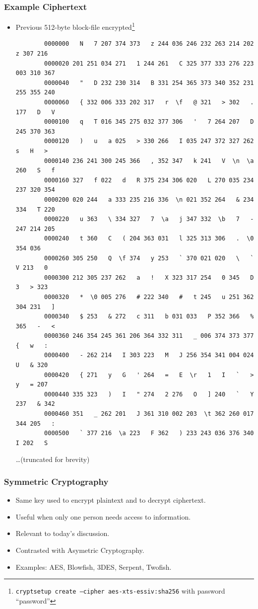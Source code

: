 \documentclass[xcolor={dvipsnames,svgnames},hyperref=dvips]{beamer}
\begin{document}
	\begin{frame}[fragile]
		\frametitle{Example Ciphertext}
		\begin{itemize}
		\item Previous 512-byte block-file encrypted\footnote{\texttt{cryptsetup create --cipher aes-xts-essiv:sha256} with password ``password''} \\
		\begin{lstlisting}
		0000000   N   7 207 374 373   z 244 036 246 232 263 214 202   z 307 216
		0000020 201 251 034 271   1 244 261   C 325 377 333 276 223 003 310 367
		0000040   "   D 232 230 314   B 331 254 365 373 340 352 231 255 355 240
		0000060   { 332 006 333 202 317   r  \f   @ 321   > 302   . 177   D   V
		0000100   q   T 016 345 275 032 377 306   '   7 264 207   D 245 370 363
		0000120   )   u   a 025   > 330 266   I 035 247 372 327 262   s   H   >
		0000140 236 241 300 245 366   , 352 347   k 241   V  \n  \a 260   S   f
		0000160 327   f 022   d   R 375 234 306 020   L 270 035 234 237 320 354
		0000200 020 244   a 333 235 216 336  \n 021 352 264   & 234 334   T 220
		0000220   u 363   \ 334 327   7  \a   j 347 332  \b   7   - 247 214 205
		0000240   t 360   C   ( 204 363 031   l 325 313 306   .  \0 354 036    
		0000260 305 250   Q  \f 374   y 253   ` 370 021 020   \   `   V 213   0
		0000300 212 305 237 262   a   !   X 323 317 254   0 345   D   3   > 323
		0000320   *  \0 005 276   # 222 340   #   t 245   u 251 362 304 231   ]
		0000340   $ 253   & 272   c 311   b 031 033   P 352 366   % 365   -   <
		0000360 246 354 245 361 206 364 332 311   _ 006 374 373 377   {   w   :
		0000400   - 262 214   I 303 223   M   J 256 354 341 004 024   U   & 320
		0000420   { 271   y   G   ' 264   =   E  \r   1   I   `   >   y   = 207
		0000440 335 323   )   I   " 274   2 276   O   ] 240   `   Y 237   & 342
		0000460 351   _ 262 201   J 361 310 002 203  \t 362 260 017 344 205   :
		0000500   ` 377 216  \a 223   F 362   ) 233 243 036 376 340   I 202   S
		\end{lstlisting}
		{\tiny \ldots (truncated for brevity)}
		\end{itemize}
	\end{frame}

	\begin{frame}
		\frametitle{Symmetric Cryptography}
		\begin{itemize}
		\item Same key used to encrypt plaintext and to decrypt ciphertext. 
		\item Useful when only one person needs access to information.
		\item Relevant to today's discussion.
		\item Contrasted with Asymetric Cryptography.
		\item Examples: AES, Blowfish, 3DES, Serpent, Twofish.
		\end{itemize}
	\end{frame}
\end{document}
